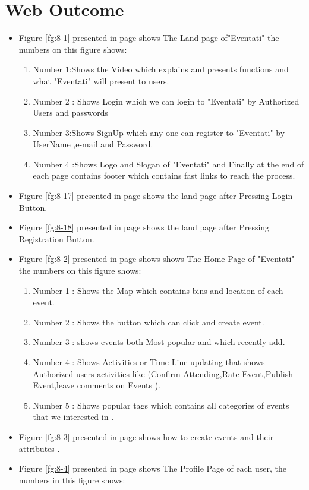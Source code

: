 \documentclass[12pt,a4paper,class,twoside,openany]{report}
\begin{document}
{\section{Web Outcome}
\begin{itemize}
\item
Figure \ref{fg:8-1} presented in page \pageref{fg:8-1} shows The Land page of"Eventati" the numbers on this figure shows:
\begin{enumerate}
\item Number 1:Shows the Video which explains and presents functions and what "Eventati" will present to users.
\item Number 2 : Shows Login which we can login to "Eventati" by Authorized Users and passwords 
\item Number 3:Shows SignUp which any one can register to "Eventati" by UserName ,e-mail and Password.
\item Number 4 :Shows Logo and Slogan of "Eventati" 
and Finally at the end of each page contains footer which contains fast links to reach the process.
\end{enumerate}
\item Figure \ref{fg:8-17} presented in page \pageref{fg:8-17} shows the land page after Pressing Login Button.
\item Figure \ref{fg:8-18} presented in page \pageref{fg:8-18}shows the land page after Pressing Registration Button.
\item Figure \ref{fg:8-2} presented in page \pageref{fg:8-2} shows shows The Home Page of "Eventati" the numbers on this figure shows:
\begin{enumerate}
\item Number 1 : Shows the Map which contains bins and location of each event.
\item Number 2 : Shows the button which can click and create event.
\item Number 3 : shows events both Most popular and which recently add.
\item Number 4 : Shows Activities or Time Line updating that shows Authorized users activities like (Confirm Attending,Rate Event,Publish Event,leave comments on Events ). 
\item Number 5 : Shows popular tags which contains all categories of events that we interested  in .
\end{enumerate}
\item Figure \ref{fg:8-3} presented in page \pageref{fg:8-3} shows how to create events and their attributes .
\item Figure \ref{fg:8-4} presented in page \pageref{fg:8-4} shows The Profile Page of each user, the numbers in this figure shows:

\end{itemize}}
\end{document}
